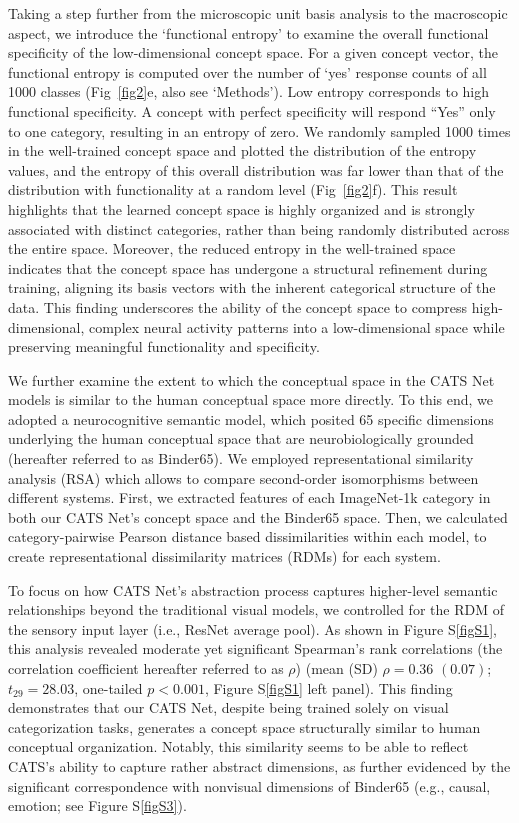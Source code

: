 \documentclass[pdflatex,sn-mathphys-num,lineno]{sn-jnl}%
\begin{document}
\begin{CJK}{UTF8}{gbsn}
Taking a step further from the microscopic unit basis analysis to the macroscopic aspect, we introduce the ‘functional entropy’ to examine the overall functional specificity of the low-dimensional concept space. For a given concept vector, the functional entropy is computed over the number of ‘yes’ response counts of all 1000 classes (Fig~\ref{fig2}e, also see ‘Methods’). Low entropy corresponds to high functional specificity. A concept with perfect specificity will respond “Yes” only to one category, resulting in an entropy of zero. We randomly sampled 1000 times in the well-trained concept space and plotted the distribution of the entropy values, and the entropy of this overall distribution was far lower than that of the distribution with functionality at a random level (Fig~\ref{fig2}f). This result highlights that the learned concept space is highly organized and is strongly associated with distinct categories, rather than being randomly distributed across the entire space. Moreover, the reduced entropy in the well-trained space indicates that the concept space has undergone a structural refinement during training, aligning its basis vectors with the inherent categorical structure of the data. This finding underscores the ability of the concept space to compress high-dimensional, complex neural activity patterns into a low-dimensional space while preserving meaningful functionality and specificity.

We further examine the extent to which the conceptual space in the CATS Net models is similar to the human conceptual space more directly. To this end, we adopted a neurocognitive semantic model, which posited 65 specific dimensions underlying the human conceptual space that are neurobiologically grounded \cite{binder_toward_2016} (hereafter referred to as Binder65). We employed representational similarity analysis (RSA) \cite{kriegeskorte_representational_2008} which allows to compare second-order isomorphisms between different systems. First, we extracted features of each ImageNet-1k category in both our CATS Net's concept space and the Binder65 space. Then, we calculated category-pairwise Pearson distance based dissimilarities within each model, to create representational dissimilarity matrices (RDMs) for each system. 

To focus on how CATS Net's abstraction process captures higher-level semantic relationships beyond the traditional visual models, we controlled for the RDM of the sensory input layer (i.e., ResNet average pool). As shown in Figure S\ref{figS1}, this analysis revealed moderate yet significant Spearman’s rank correlations (the correlation coefficient hereafter referred to as $\rho$) (mean (SD) $\rho = 0.36$ $(0.07)$; $t_{29} = 28.03$, one-tailed $p < 0.001$, Figure S\ref{figS1} left panel). This finding demonstrates that our CATS Net, despite being trained solely on visual categorization tasks, generates a concept space structurally similar to human conceptual organization. Notably, this similarity seems to be able to reflect CATS’s ability to capture rather abstract dimensions, as further evidenced by the significant correspondence with nonvisual dimensions of Binder65 (e.g., causal, emotion; see Figure S\ref{figS3}).


\end{CJK}
\end{document}
